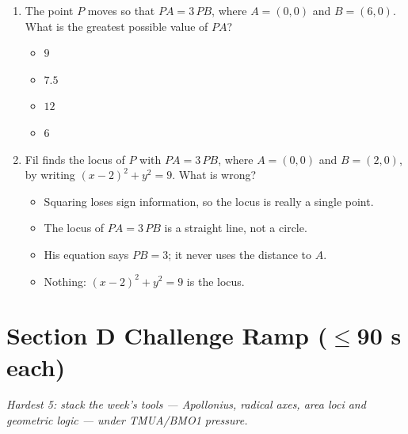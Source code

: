 \documentclass[11pt,a4paper]{article}
\begin{document}
\begin{enumerate}
\item The point $P$ moves so that $PA=3\,PB$, where $A=(0,0)$ and $B=(6,0)$. What is the greatest possible value of $PA$?
\begin{itemize}
\item[A)] $9$
\item[B)] $7.5$
\item[C)] $12$
\item[D)] $6$
\end{itemize}

\item Fil finds the locus of $P$ with $PA=3\,PB$, where $A=(0,0)$ and $B=(2,0)$, by writing $(x-2)^2+y^2=9$. What is wrong?
\begin{itemize}
\item[A)] Squaring loses sign information, so the locus is really a single point.
\item[B)] The locus of $PA=3\,PB$ is a straight line, not a circle.
\item[C)] His equation says $PB=3$; it never uses the distance to $A$.
\item[D)] Nothing: $(x-2)^2+y^2=9$ is the locus.
\end{itemize}

\end{enumerate}

\section*{Section D \quad Challenge Ramp \hfill{\normalfont\small($\leq$90 s each)}}

\noindent\textit{Hardest 5: stack the week's tools — Apollonius, radical axes, area loci and geometric logic — under TMUA/BMO1 pressure.}
\end{document}
